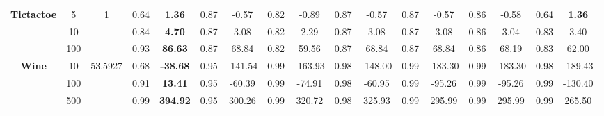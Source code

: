\documentclass[letterpaper]{article}
\theoremstyle{definition}
\begin{document}
\begin{table}[t]
\begin{tabular}{|c|c|c|c|c|c|c|c|c|c|c|c|c|c|c|c|c|}
\multirow{3}{*}{\textbf{Tictactoe}} & 5        & 1        & 0.64  & \textbf{1.36}    & 0.87  & -0.57            & 0.82   & -0.89             & 0.87      & -0.57        & 0.87  & -0.57            & 0.86     & -0.58              & 0.64   & \textbf{1.36}    \\ \cline{2-17}
                                    & 10       &          & 0.84  & \textbf{4.70}    & 0.87  & 3.08             & 0.82   & 2.29              & 0.87      & 3.08         & 0.87  & 3.08             & 0.86     & 3.04               & 0.83   & 3.40             \\ \cline{2-17}
                                    & 100      &          & 0.93  & \textbf{86.63}   & 0.87  & 68.84            & 0.82   & 59.56             & 0.87      & 68.84        & 0.87  & 68.84            & 0.86     & 68.19              & 0.83   & 62.00            \\ \hline
\multirow{3}{*}{\textbf{Wine}}      & 10       & 53.5927  & 0.68  & \textbf{-38.68}  & 0.95  & -141.54          & 0.99   & -163.93           & 0.98      & -148.00      & 0.99  & -183.30          & 0.99     & -183.30            & 0.98   & -189.43          \\ \cline{2-17}
                                    & 100      &          & 0.91  & \textbf{13.41}   & 0.95  & -60.39           & 0.99   & -74.91            & 0.98      & -60.95       & 0.99  & -95.26           & 0.99     & -95.26             & 0.99   & -130.40          \\ \cline{2-17}
                                    & 500      &          & 0.99  & \textbf{394.92}  & 0.95  & 300.26           & 0.99   & 320.72            & 0.98      & 325.93       & 0.99  & 295.99           & 0.99     & 295.99             & 0.99   & 265.50           \\ \hline


\end{tabular}
\end{table}
\end{document}
